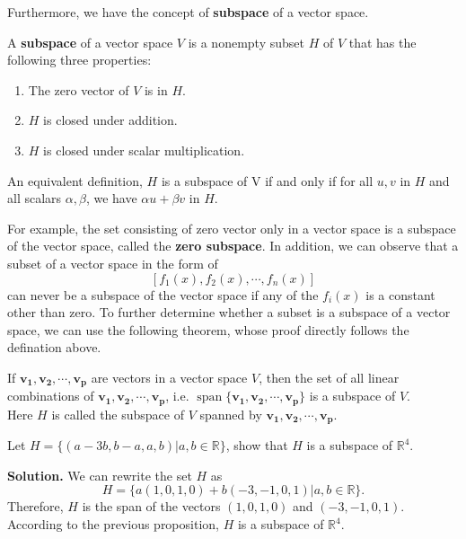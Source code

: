 \documentclass[10pt, a4paper]{article}
\newcommand{\R}{\mathbb{R}}
\begin{document}
Furthermore, we have the concept of \textbf{subspace} of a vector space.
\begin{definition}
    A \textbf{subspace} of a vector space $V$ is a nonempty subset $H$ of $V$ that has the following three properties:
    \begin{enumerate}
        \item The zero vector of $V$ is in $H$.
        \item $H$ is closed under addition.
        \item $H$ is closed under scalar multiplication.
    \end{enumerate}
    An equivalent definition, $H$ is a subspace of V if and only if for all $u, v$ in $H$ and all scalars $\alpha, \beta$, we have $\alpha u + \beta v$ in $H$.
\end{definition}
For example, the set consisting of zero vector only in a vector space is a subspace of the vector space, called the \textbf{zero subspace}. In addition, we can observe that a subset of a vector space in the form of $$
[f_1(x), f_2(x), \cdots, f_n(x)]
$$
can never be a subspace of the vector space if any of the $f_i(x)$ is a constant other than zero. To further determine whether a subset is a subspace of a vector space, we can use the following theorem, whose proof directly follows the defination above.
\begin{proposition}
    If $\mathbf{v_1}, \mathbf{v_2}, \cdots, \mathbf{v_p}$ are vectors in a vector space $V$, then the set of all linear combinations of $\mathbf{v_1}, \mathbf{v_2}, \cdots, \mathbf{v_p}$, i.e. $\operatorname*{span}\{\mathbf{v_1}, \mathbf{v_2}, \cdots, \mathbf{v_p}\}$ is a subspace of $V$.\\
    Here $H$ is called the subspace of $V$ spanned by $\mathbf{v_1}, \mathbf{v_2}, \cdots, \mathbf{v_p}$.
\end{proposition}
\begin{example}
    Let $H = \{(a-3b,b-a,a,b) | a,b\in \R\}$, show that $H$ is a subspace of $\R^4$.\\
\end{example}
\indent \textbf{Solution.} 
    We can rewrite the set $H$ as $$
    H = \{a(1,0,1,0) + b(-3,-1,0,1) | a,b\in \R\}.
    $$
    Therefore, $H$ is the span of the vectors $(1,0,1,0)$ and $(-3,-1,0,1)$. According to the previous proposition, $H$ is a subspace of $\R^4$.
\end{document}
